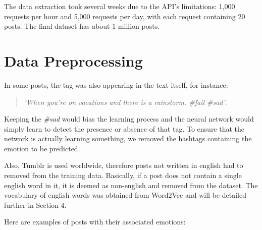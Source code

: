 The data extraction took several weeks due to the API's limitations: 1,000 requests per hour and 5,000 requests per day, with each request containing 20 posts. The final dataset has about 1 million posts.

\section{Data Preprocessing}
In some posts, the tag was also appearing in the text itself, for instance:
\begin{quote}
\textit{`When you're on vacations and there is a rainstorm. \#fail \#sad'}.
\end{quote}
Keeping the \textit{\#sad} would bias the learning process and the neural network would simply learn to detect the presence or absence of that tag. To ensure that the network is actually learning something, we removed the hashtags containing the emotion to be predicted.

Also, Tumblr is used worldwide, therefore posts not written in english had to removed from the training data. Basically, if a post does not contain a single english word in it, it is deemed as non-english and removed from the dataset. The vocabulary of english words was obtained from Word2Vec and will be detailed further in Section 4.

Here are examples of posts with their associated emotions:

